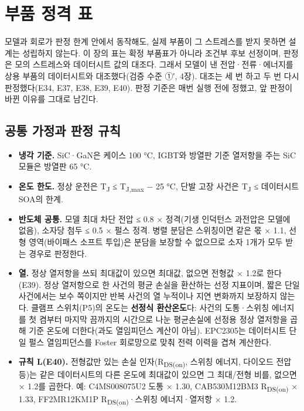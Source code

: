 \chapter{부품 정격 표}

모델과 회로가 판정 한계 안에서 동작해도, 실제 부품이 그 스트레스를 받지 못하면 설계는 성립하지 않는다. 이 장의 표는 확정 부품표가 아니라 조건부 후보 선정이며, 판정은 모의 스트레스와 데이터시트 값의 대조다. 그래서 모델이 낸 전압·전류·에너지를 상용 부품의 데이터시트와 대조했다(검증 수준 ①′, 4장). 대조는 세 번 하고 두 번 다시 판정했다(E34, E37, E38, E39, E40). 판정 기준은 매번 실행 전에 정했고, 앞 판정이 바뀐 이유를 그대로 남긴다.

\section{공통 가정과 판정 규칙}

\begin{itemize}
\item \textbf{냉각 기준.} SiC·GaN은 케이스 100 °C, IGBT와 방열판 기준 열저항을 주는 SiC 모듈은 방열판 65 °C.
\item \textbf{온도 한도.} 정상 운전은 T\textsubscript{J} ≤ T\textsubscript{J,max} − 25 °C, 단발 고장 사건은 T\textsubscript{J} ≤ 데이터시트 SOA의 한계.
\item \textbf{반도체 공통.} 모델 최대 차단 전압 ≤ 0.8 × 정격(기생 인덕턴스 과전압은 모델에 없음), 소자당 첨두 ≤ 0.5 × 펄스 정격. 병렬 분담은 스위칭이면 같은 몫 × 1.1, 선형 영역(바이패스 소프트 투입)은 분담을 보장할 수 없으므로 소자 1개가 모두 받는 경우로 판정한다.
\item \textbf{열.} 정상 열저항을 쓰되 최대값이 있으면 최대값, 없으면 전형값 × 1.2로 한다(E39). 정상 열저항으로 한 사건의 평균 손실을 환산하는 선정 지표이며, 짧은 단일 사건에서는 보수 쪽이지만 반복 사건의 열 누적이나 지연 변화까지 보장하지 않는다. 클램프 스위치(P5)의 온도는 \textbf{선정식 환산온도}다: 사건의 도통·스위칭 에너지를 첫 켬부터 마지막 끔까지의 시간으로 나눈 평균손실에 선정용 정상 열저항을 곱해 기준 온도에 더한다(과도 열임피던스 계산이 아님). EPC2305는 데이터시트 단일 펄스 열임피던스를 Foster 회로망으로 맞춰 전력 이력을 겹쳐 계산한다.
\item \textbf{규칙 L(E40).} 전형값만 있는 손실 인자(R\textsubscript{DS(on)}, 스위칭 에너지, 다이오드 전압 등)는 같은 데이터시트의 다른 온도에 최대값이 있으면 그 최대/전형 비를, 없으면 × 1.2를 곱한다. 예: C4MS008075U2 도통 × 1.30, CAB530M12BM3 R\textsubscript{DS(on)} × 1.33, FF2MR12KM1P R\textsubscript{DS(on)}·스위칭 에너지·열저항 × 1.2.
\end{itemize}

